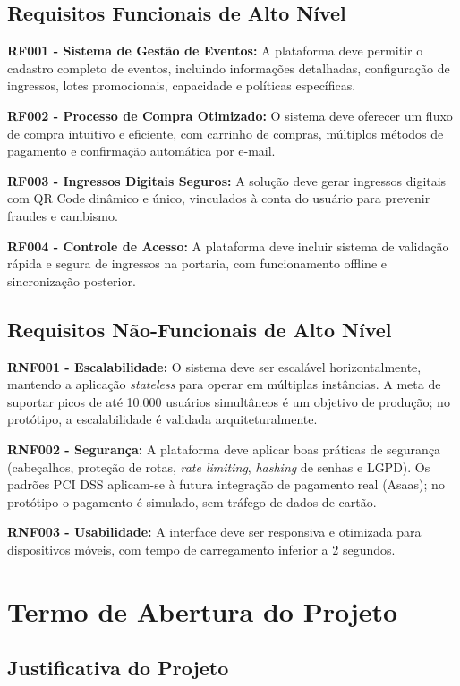 \subsection{Requisitos Funcionais de Alto Nível}

\textbf{RF001 - Sistema de Gestão de Eventos:}
A plataforma deve permitir o cadastro completo de eventos, incluindo informações detalhadas, configuração de ingressos, lotes promocionais, capacidade e políticas específicas.

\textbf{RF002 - Processo de Compra Otimizado:}
O sistema deve oferecer um fluxo de compra intuitivo e eficiente, com carrinho de compras, múltiplos métodos de pagamento e confirmação automática por e-mail.

\textbf{RF003 - Ingressos Digitais Seguros:}
A solução deve gerar ingressos digitais com QR Code dinâmico e único, vinculados à conta do usuário para prevenir fraudes e cambismo.

\textbf{RF004 - Controle de Acesso:}
A plataforma deve incluir sistema de validação rápida e segura de ingressos na portaria, com funcionamento offline e sincronização posterior.

\subsection{Requisitos Não-Funcionais de Alto Nível}

\textbf{RNF001 - Escalabilidade:}
O sistema deve ser escalável horizontalmente, mantendo a aplicação \textit{stateless} para operar em múltiplas instâncias. A meta de suportar picos de até 10.000 usuários simultâneos é um objetivo de produção; no protótipo, a escalabilidade é validada arquiteturalmente.

\textbf{RNF002 - Segurança:}
A plataforma deve aplicar boas práticas de segurança (cabeçalhos, proteção de rotas, \textit{rate limiting}, \textit{hashing} de senhas e LGPD). Os padrões PCI DSS aplicam-se à futura integração de pagamento real (Asaas); no protótipo o pagamento é simulado, sem tráfego de dados de cartão.

\textbf{RNF003 - Usabilidade:}
A interface deve ser responsiva e otimizada para dispositivos móveis, com tempo de carregamento inferior a 2 segundos.

\section{Termo de Abertura do Projeto}

\subsection{Justificativa do Projeto}

